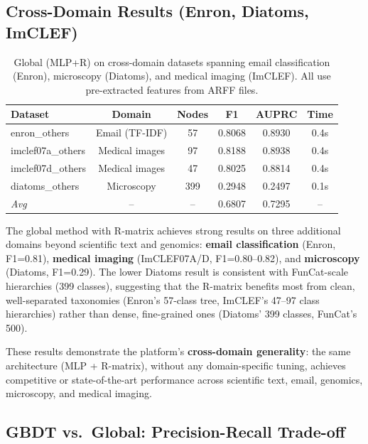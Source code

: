 \documentclass[11pt,a4paper]{article}
\begin{document}
\subsection{Cross-Domain Results (Enron, Diatoms, ImCLEF)}
\label{sec:others}

\begin{table}[h]
\centering
\caption{Global (MLP+R) on cross-domain datasets spanning email
classification (Enron), microscopy (Diatoms), and medical imaging
(ImCLEF).  All use pre-extracted features from ARFF files.}
\label{tab:others}
\begin{tabular}{lccccc}
\toprule
\textbf{Dataset} & \textbf{Domain} & \textbf{Nodes} & \textbf{F1} &
\textbf{AUPRC} & \textbf{Time} \\
\midrule
enron\_others     & Email (TF-IDF)       & 57   & 0.8068 & 0.8930 & 0.4s \\
imclef07a\_others & Medical images       & 97   & 0.8188 & 0.8938 & 0.4s \\
imclef07d\_others & Medical images       & 47   & 0.8025 & 0.8814 & 0.4s \\
diatoms\_others   & Microscopy           & 399  & 0.2948 & 0.2497 & 0.1s \\
\midrule
\textit{Avg}      & --                   & --   & 0.6807 & 0.7295 & -- \\
\bottomrule
\end{tabular}
\end{table}

The global method with R-matrix achieves strong results on three
additional domains beyond scientific text and genomics:
\textbf{email classification} (Enron, F1=0.81), \textbf{medical
imaging} (ImCLEF07A/D, F1=0.80--0.82), and \textbf{microscopy}
(Diatoms, F1=0.29).  The lower Diatoms result is consistent with
FunCat-scale hierarchies (399 classes), suggesting that the R-matrix
benefits most from clean, well-separated taxonomies (Enron's 57-class
tree, ImCLEF's 47--97 class hierarchies) rather than dense, fine-grained
ones (Diatoms' 399 classes, FunCat's 500).

These results demonstrate the platform's \textbf{cross-domain
generality}: the same architecture (MLP + R-matrix), without any
domain-specific tuning, achieves competitive or state-of-the-art
performance across scientific text, email, genomics, microscopy, and
medical imaging.

\subsection{GBDT vs.\ Global: Precision-Recall Trade-off}
\end{document}
